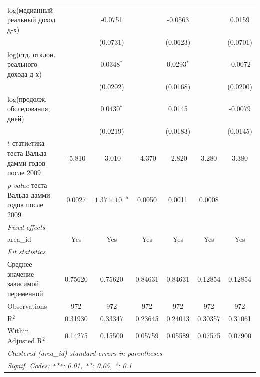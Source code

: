 \begin{tabular}{lcccccc}
   log(медианный реальный доход д-х)           &                       & -0.0751         &                       & -0.0563         &                & 0.0159\\   
                                    &                       & (0.0731)        &                       & (0.0623)        &                & (0.0701)\\   
   log(стд. отклон. реального дохода д-х)             &                       & 0.0348$^{*}$    &                       & 0.0293$^{*}$    &                & -0.0072\\   
                                    &                       & (0.0202)        &                       & (0.0168)        &                & (0.0200)\\   
   log(продолж. обследования, дней)            &                       & 0.0430$^{*}$    &                       & 0.0145          &                & -0.0079\\   
                                    &                       & (0.0219)        &                       & (0.0183)        &                & (0.0145)\\   
   $t$-статиcтика теста Вальда дамми годов после 2009           & -5.810                & -3.010          & -4.370                & -2.820          & 3.280          & 3.380\\  
  \textit{p-value} теста Вальда дамми годов после 2009 & 0.0027          & $1.37\times 10^{-5}$  & 0.0050          & 0.0011         & 0.0008\\  
   \midrule
   \emph{Fixed-effects}\\
   area\_id                         & Yes                   & Yes             & Yes                   & Yes             & Yes            & Yes\\  
   \midrule
   \emph{Fit statistics}\\
   Среднее значение зависимой переменной          & 0.75620               & 0.75620         & 0.84631               & 0.84631         & 0.12854        & 0.12854\\  
   Observations                     & 972                   & 972             & 972                   & 972             & 972            & 972\\  
   R$^2$                            & 0.31930               & 0.33347         & 0.23645               & 0.24013         & 0.30357        & 0.31061\\  
   Within Adjusted R$^2$            & 0.14275               & 0.15500         & 0.05759               & 0.05589         & 0.07575        & 0.07900\\  
   \midrule \midrule
   \multicolumn{7}{l}{\emph{Clustered (area\_id) standard-errors in parentheses}}\\
   \multicolumn{7}{l}{\emph{Signif. Codes: ***: 0.01, **: 0.05, *: 0.1}}\\
\end{tabular}
\par\endgroup


